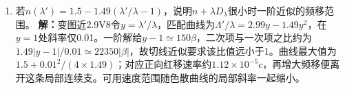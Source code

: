 \documentclass[UTF8,fontset=fandol,a4paper,11pt]{ctexart}
\begin{document}
\begin{enumerate}
\item 若$n(\lambda')=1.5-1.49(\lambda'/\lambda-1)$，说明$n+\lambda D_\lambda$很小时一阶近似的频移范围。
\textbf{解：}变图近2.9V8令$y=\lambda'/\lambda$，匹配曲线为$\Lambda'/\lambda=2.99y-1.49y^2$，在$y=1$处斜率仅0.01。一阶解给$y-1\simeq150\beta$，二次项与一次项之比约为$1.49|y-1|/0.01\simeq22350|\beta|$，故切线近似要求该比值远小于1。曲线最大值为$1.5+0.01^2/(4\times1.49)$；对应正向红移速率约$1.12\times10^{-5}c$，再增大频移便离开这条局部连续支。可用速度范围随色散曲线的局部斜率一起缩小。
\begin{center}\begin{minipage}{.98\linewidth}\centering
{}
\end{minipage}
\end{center}
\end{enumerate}
\end{document}
